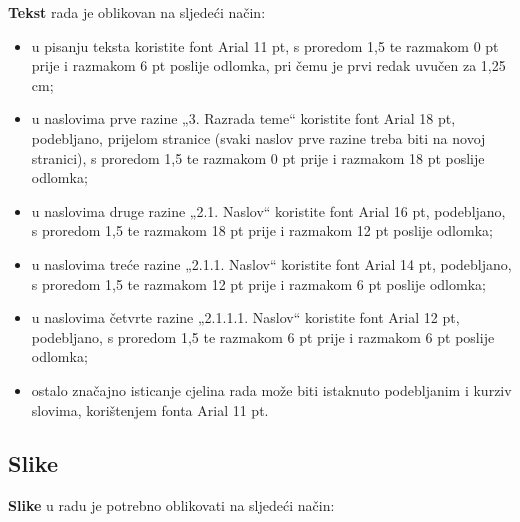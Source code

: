 \documentclass[]{foi}
\begin{document}
\textbf{Tekst} rada je oblikovan na sljedeći način:
\begin{itemize}
	\item u pisanju teksta koristite font Arial 11 pt, s proredom 1,5 te razmakom 0 pt prije i razmakom 6 pt poslije odlomka, pri čemu je prvi redak uvučen za 1,25 cm;

	\item u naslovima prve razine „3. Razrada teme“ koristite font Arial 18 pt, podebljano, prijelom stranice (svaki naslov prve razine treba biti na novoj stranici), s proredom 1,5 te razmakom 0 pt prije i razmakom 18 pt poslije odlomka;

	\item u naslovima druge razine „2.1. Naslov“ koristite font Arial 16 pt, podebljano, s proredom 1,5 te razmakom 18 pt prije i razmakom 12 pt poslije odlomka;

	\item u naslovima treće razine „2.1.1. Naslov“ koristite font Arial 14 pt, podebljano, s proredom 1,5 te razmakom 12 pt prije i razmakom 6 pt poslije odlomka;

	\item u naslovima četvrte razine „2.1.1.1. Naslov“ koristite font Arial 12 pt, podebljano, s proredom 1,5 te razmakom 6 pt prije i razmakom 6 pt poslije odlomka;

	\item ostalo značajno isticanje cjelina rada može biti istaknuto podebljanim i kurziv slovima, korištenjem fonta Arial 11 pt.
\end{itemize}

\subsection{Slike}

\textbf{Slike} u radu je potrebno oblikovati na sljedeći način:
\end{document}
